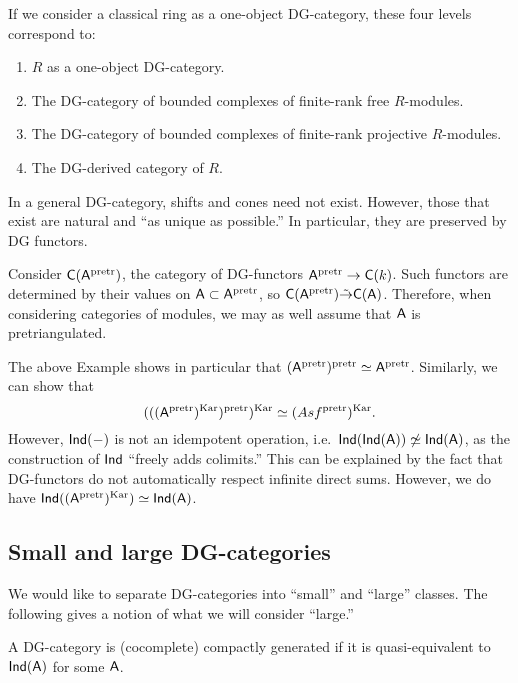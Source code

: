\documentclass{amsart}
\begin{document}
If we consider a classical ring as a one-object DG-category, these four levels correspond to:
\begin{enumerate}
	\item $R$ as a one-object DG-category.
	\item The DG-category of bounded complexes of finite-rank free $R$-modules.
	\item The DG-category of bounded complexes of finite-rank projective $R$-modules.
	\item The DG-derived category of $R$.
\end{enumerate}

\begin{rmk}
	In a general DG-category, shifts and cones need not exist.
	However, those that exist are natural and ``as unique as possible.''
	In particular, they are preserved by DG functors.
\end{rmk}

\begin{ex}
	Consider $\mathsf{C}(\mathsf{A}^{\mathrm{pretr}})$, the category of DG-functors $\mathsf{A}^{\mathrm{pretr}} \to \mathsf{C}(k)$.
	Such functors are determined by their values on $\mathsf{A} \subset \mathsf{A}^{\mathrm{pretr}}$, so $\mathsf{C}(\mathsf{A}^{\mathrm{pretr}}) \tilde{\to} \mathsf{C}(\mathsf{A})$.
	Therefore, when considering categories of modules, we may as well assume that $\mathsf{A}$ is pretriangulated.
\end{ex}

The above Example shows in particular that $(\mathsf{A}^{\mathrm{pretr}})^{\mathrm{pretr}} \simeq \mathsf{A}^{\mathrm{pretr}}$.
Similarly, we can show that 
\[
	(((\mathsf{A}^{\mathrm{pretr}})^{\mathrm{Kar}})^{\mathrm{pretr}})^{\mathrm{Kar}} \simeq (Asf^{\mathrm{pretr}})^{\mathrm{Kar}}.
\]
However, $\mathsf{Ind}(-)$ is not an idempotent operation, i.e.\ $\mathsf{Ind}(\mathsf{Ind}(\mathsf{A})) \not\simeq \mathsf{Ind}(\mathsf{A})$, as the construction of $\mathsf{Ind}$ ``freely adds colimits.''
This can be explained by the fact that DG-functors do not automatically respect infinite direct sums.
However, we do have $\mathsf{Ind}((\mathsf{A}^{\mathrm{pretr}})^{\mathrm{Kar}}) \simeq \mathsf{Ind}(\mathsf{A})$.

\subsection{Small and large DG-categories}

We would like to separate DG-categories into ``small'' and ``large'' classes.
The following gives a notion of what we will consider ``large.''

\begin{dfn}
	A DG-category is (cocomplete) compactly generated if it is quasi-equivalent to $\mathsf{Ind}(\mathsf{A})$ for some $\mathsf{A}$.
\end{dfn}
\end{document}
